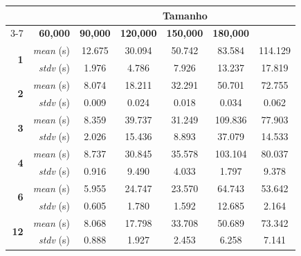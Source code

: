 \begin{tabular}{rr|ccccc}
\toprule
\multicolumn{2}{r|}{} & \multicolumn{5}{c}{\textbf{Tamanho}} \\
\cmidrule(lr){3-7}
\multicolumn{2}{c|}{\textbf{Threads}} & \textbf{60,000} & \textbf{90,000} & \textbf{120,000} & \textbf{150,000} & \textbf{180,000} \\
\midrule
\multirow{2}{*}{\textbf{1}}
& \textit{mean} (s) & 12.675 & 30.094 & 50.742 & 83.584 & 114.129 \\
& \textit{stdv} (s) & 1.976 & 4.786 & 7.926 & 13.237 & 17.819 \\
\midrule
\multirow{2}{*}{\textbf{2}}
& \textit{mean} (s) & 8.074 & 18.211 & 32.291 & 50.701 & 72.755 \\
& \textit{stdv} (s) & 0.009 & 0.024 & 0.018 & 0.034 & 0.062 \\
\midrule
\multirow{2}{*}{\textbf{3}}
& \textit{mean} (s) & 8.359 & 39.737 & 31.249 & 109.836 & 77.903 \\
& \textit{stdv} (s) & 2.026 & 15.436 & 8.893 & 37.079 & 14.533 \\
\midrule
\multirow{2}{*}{\textbf{4}}
& \textit{mean} (s) & 8.737 & 30.845 & 35.578 & 103.104 & 80.037 \\
& \textit{stdv} (s) & 0.916 & 9.490 & 4.033 & 1.797 & 9.378 \\
\midrule
\multirow{2}{*}{\textbf{6}}
& \textit{mean} (s) & 5.955 & 24.747 & 23.570 & 64.743 & 53.642 \\
& \textit{stdv} (s) & 0.605 & 1.780 & 1.592 & 12.685 & 2.164 \\
\midrule
\multirow{2}{*}{\textbf{12}}
& \textit{mean} (s) & 8.068 & 17.798 & 33.708 & 50.689 & 73.342 \\
& \textit{stdv} (s) & 0.888 & 1.927 & 2.453 & 6.258 & 7.141 \\
\bottomrule
\end{tabular}